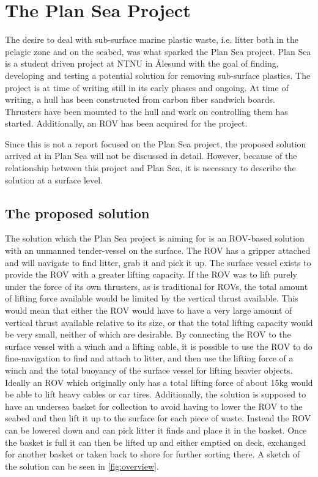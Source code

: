 \documentclass[class=article, crop=false]{standalone}
\begin{document}
\section{The Plan Sea Project}
The desire to deal with sub-surface marine plastic waste, i.e. litter both in the pelagic zone and on the seabed, was what sparked the Plan Sea project. Plan Sea is a student driven project at NTNU in Ålesund with the goal of finding, developing and testing a potential solution for removing sub-surface plastics. The project is at time of writing still in its early phases and ongoing. At time of writing, a hull has been constructed from carbon fiber sandwich boards. Thrusters have been mounted to the hull and work on controlling them has started. Additionally, an ROV has been acquired for the project. 

Since this is not a report focused on the Plan Sea project, the proposed solution arrived at in Plan Sea will not be discussed in detail. However, because of the relationship between this project and Plan Sea, it is necessary to describe the solution at a surface level. 

\subsection{The proposed solution}
The solution which the Plan Sea project is aiming for is an ROV-based solution with an unmanned tender-vessel on the surface. The ROV has a gripper attached and will navigate to find litter, grab it and pick it up. The surface vessel exists to provide the ROV with a greater lifting capacity. If the ROV was to lift purely under the force of its own thrusters, as is traditional for ROVs, the total amount of lifting force available would be limited by the vertical thrust available. This would mean that either the ROV would have to have a very large amount of vertical thrust available relative to its size, or that the total lifting capacity would be very small, neither of which are desirable. By connecting the ROV to the surface vessel with a winch and a lifting cable, it is possible to use the ROV to do fine-navigation to find and attach to litter, and then use the lifting force of a winch and the total buoyancy of the surface vessel for lifting heavier objects. Ideally an ROV which originally only has a total lifting force of about 15kg would be able to lift heavy cables or car tires. Additionally, the solution is supposed to have an undersea basket for collection to avoid having to lower the ROV to the seabed and then lift it up to the surface for each piece of waste. Instead the ROV can be lowered down and can pick litter it finds and place it in the basket. Once the basket is full it can then be lifted up and either emptied on deck, exchanged for another basket or taken back to shore for further sorting there. A sketch of the solution can be seen in \cref{fig:overview}.
\end{document}
